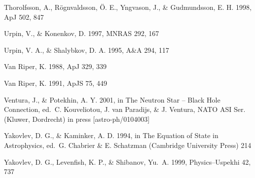 \documentclass{aa}
\begin{document}
\begin{thebibliography}{}
Thorolfsson, A., R\"ognvaldsson, \"O. E., Yngvason, J., \& Gudmundsson, E. H. 
1998, ApJ 502, 847

Urpin, V., \& Konenkov, D. 1997, MNRAS 292, 167 

Urpin, V. A., \& Shalybkov, D. A. 1995, A\&A 294, 117

Van Riper, K. 1988,
ApJ 329, 339

Van Riper, K. 1991,
ApJS 75, 449

Ventura, J., \& Potekhin, A. Y. 2001,
in The Neutron Star -- Black Hole Connection,
ed.\ C. Kouveliotou, J. van Paradijs, \& J. Ventura,
NATO ASI Ser.
(Kluwer, Dordrecht) in press [astro-ph/0104003]
 
Yakovlev, D. G., \& Kaminker, A. D. 1994,
in The Equation of State in Astrophysics,
ed.\ G. Chabrier \& E. Schatzman
(Cambridge University Press) 214

Yakovlev, D. G., Levenfish, K. P., \& Shibanov, Yu.\ A. 1999,
Physics--Uspekhi 42, 737


\end{thebibliography} 
\end{document}
